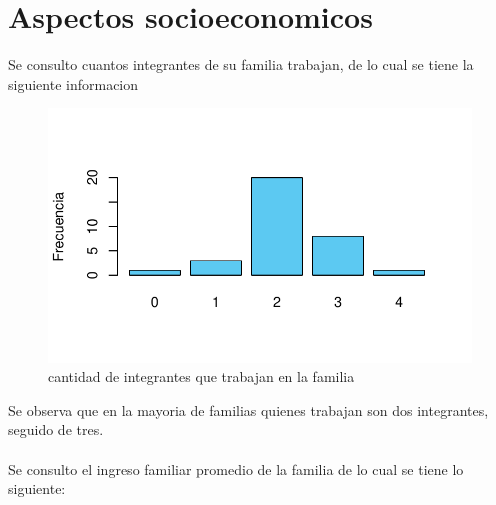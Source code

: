 \documentclass[12pt]{article}\usepackage[]{graphicx}\usepackage[]{xcolor}
\makeatletter
\def\maxwidth{ %
  \ifdim\Gin@nat@width>\linewidth
    \linewidth
  \else
    \Gin@nat@width
  \fi
}
\newenvironment{knitrout}{}{} %
\makeatother
\begin{document}
	\section{Aspectos socioeconomicos}
	Se consulto cuantos integrantes de su familia trabajan, de lo cual se tiene la siguiente informacion
	\begin{figure}[H]
	\centering
\begin{knitrout}
\color{fgcolor}
\includegraphics[width=\maxwidth]{figure/diecinueve-1} 
\end{knitrout}
	\caption{cantidad de integrantes que trabajan en la familia}
	\end{figure}
	Se observa que en la mayoria de familias quienes trabajan son dos integrantes, seguido de tres.\\
	\\
  Se consulto el ingreso familiar promedio de la familia de lo cual se tiene lo siguiente:
\end{document}
